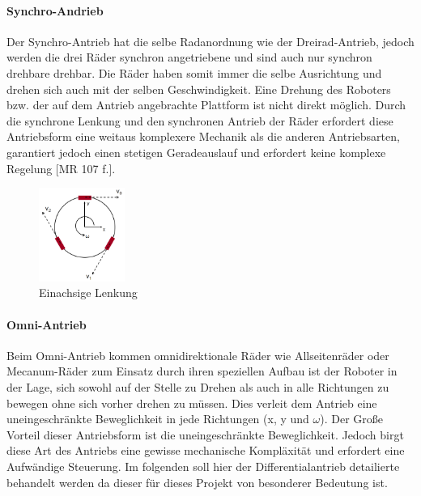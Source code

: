 \paragraph{Synchro-Andrieb}
\color{process}
Der Synchro-Antrieb hat die selbe Radanordnung wie der Dreirad-Antrieb, jedoch werden die drei Räder synchron angetriebene und sind auch nur synchron drehbare drehbar. Die Räder haben somit immer die selbe Ausrichtung und drehen sich auch mit der selben Geschwindigkeit. Eine Drehung 
des Roboters bzw. der auf dem Antrieb angebrachte Plattform ist nicht direkt möglich.
\newline
Durch die synchrone Lenkung und den synchronen Antrieb der Räder erfordert diese Antriebsform eine weitaus komplexere Mechanik als die anderen Antriebsarten, garantiert jedoch einen stetigen
Geradeauslauf und erfordert keine komplexe Regelung [MR 107 f.].
\begin{figure}
	\vspace{-1.0cm}
	\begin{center}
		\includegraphics[width=0.25\textwidth]{images/technische_grundlagen/Omniantrieb.png}
	\end{center}
	\caption{Einachsige Lenkung}
	\label{fig:einachsenlenkung}
\end{figure}
\paragraph{Omni-Antrieb}
\color{process}
Beim Omni-Antrieb kommen omnidirektionale Räder wie Allseitenräder oder Mecanum-Räder zum Einsatz durch ihren speziellen Aufbau ist der Roboter in der Lage, sich sowohl auf der Stelle zu Drehen als auch in alle Richtungen zu bewegen ohne sich vorher drehen zu müssen. Dies verleit dem Antrieb eine uneingeschränkte Beweglichkeit in jede Richtungen (x, y und $\omega{}$).
\newline
Der Große Vorteil dieser Antriebsform ist die uneingeschränkte Beweglichkeit. Jedoch birgt diese Art des Antriebs eine gewisse mechanische Kompläxität und erfordert eine Aufwändige Steuerung.
\pagebreak
\color{process}
Im folgenden soll hier der Differentialantrieb detailierte behandelt werden da dieser für dieses Projekt von besonderer Bedeutung ist.
